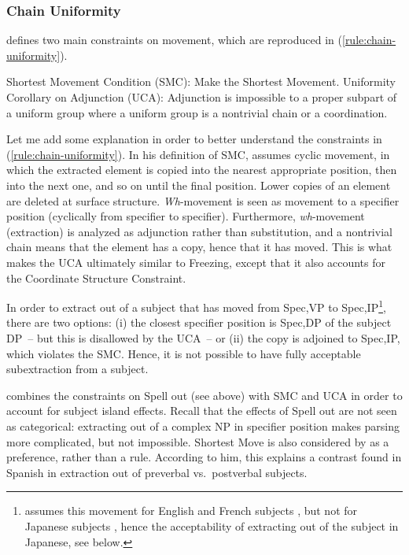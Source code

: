 \subsubsection{Chain Uniformity}

\citet{Takahashi.1994} defines two main constraints on movement, which are reproduced in (\ref{rule:chain-uniformity}).

\eal\label{rule:chain-uniformity} 
\ex Shortest Movement Condition (SMC): Make the Shortest Movement. \citep[8]{Takahashi.1994}
\ex Uniformity Corollary on Adjunction (UCA): Adjunction is impossible to a proper subpart of a uniform group where a uniform group is a nontrivial chain or a coordination. \citep[25]{Takahashi.1994}
\zl 

Let me add some explanation in order to better understand the constraints in (\ref{rule:chain-uniformity}). In his definition of SMC, \citeauthor{Takahashi.1994} assumes cyclic movement, in which the extracted element is copied into the nearest appropriate position, then into the next one, and so on until the final position. Lower copies of an element are deleted at surface structure. \emph{Wh}-movement is seen as movement to a specifier position (cyclically from specifier to specifier). Furthermore, \emph{wh}-movement (extraction) is analyzed as adjunction rather than substitution, and a nontrivial chain means that the element has a copy, hence that it has moved. This is what makes the UCA ultimately similar to Freezing, except that it also accounts for the Coordinate Structure Constraint.

In order to extract out of a subject that has moved from Spec,VP to Spec,IP\footnote{\citeauthor{Takahashi.1994} assumes this movement for English and French subjects \citep[28]{Takahashi.1994}, but not for Japanese subjects \citep[65]{Takahashi.1994}, hence the acceptability of extracting out of the subject in Japanese, see below.}, there are two options: (i) the closest specifier position is Spec,DP of the subject DP~-- but this is disallowed by the UCA~-- or (ii) the copy is adjoined to Spec,IP, which violates the SMC. Hence, it is not possible to have fully acceptable subextraction from a subject.

\citet{Uriagereka.2012} combines the constraints on Spell out (see above) with  SMC and UCA in order to account for subject island effects. Recall that the effects of Spell out are not seen as categorical: extracting out of a complex NP in specifier position makes parsing more complicated, but not impossible. Shortest Move is also considered by \citeauthor{Uriagereka.2012} as a preference, rather than a rule. According to him, this explains a contrast found in Spanish in extraction out of preverbal vs.\ postverbal subjects. 

